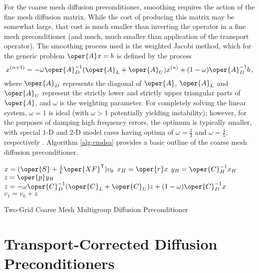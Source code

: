 For the coarse mesh diffusion preconditioner, smoothing requires the action 
of the fine mesh diffusion matrix.  While the cost of producing this 
matrix may be somewhat large, that cost is much smaller than inverting 
the operator in a fine mesh preconditioner (and much, much smaller than
application of the transport operator).  The smoothing process used is 
the weighted Jacobi method, which for the generic problem $\oper{A}x=b$ is 
defined  by the process 
\begin{equation}
 x^{(n+1)} = -\omega \oper{A}_D^{-1} ( \oper{A}_L + \oper{A}_U) x^{(n)}
           + (1-\omega) \oper{A}_D^{-1} b \, ,
\end{equation}
where $\oper{A}_D$ represents the diagonal of $\oper{A}$, 
$\oper{A}_L$ and $\oper{A}_U$ represent the strictly lower and strictly 
upper triangular parts of $\oper{A}$, and $\omega$ is the weighting 
parameter.  For completely solving the linear system, $\omega = 1$ is ideal 
(with $\omega > 1$ potentially yielding instability);
however, for the purposes of damping high frequency errors, the optimum is 
typically smaller, with special 1-D and 2-D model cases having optima 
of $\omega = \frac{2}{3}$ and $\omega = \frac{4}{5}$, 
respectively \cite{saad2003ims}.  
Algorithm \ref{alg:cmdsa} provides a basic outline of the coarse mesh 
diffusion preconditioner.

\begin{algorithm}[ht]
  \DontPrintSemicolon
  $x = (\oper{S} + \frac{1}{k}\oper{XF}^{\transp}) v_0$ \;
  $x_H = \oper{r}x$ \;
  $y_H = \oper{C}^{-1}_H x_H$ \;
  $z = \oper{p} y_H$ \;
  {
    $z =  -\omega \oper{C}_D^{-1} ( \oper{C}_L + \oper{C}_U) z
       + (1-\omega) \oper{C}_D^{-1} x $
  }
  $v_1 = v_0 + z$\;
  \caption{Two-Grid Coarse Mesh Multigroup Diffusion Preconditioner}
  \label{alg:cmdsa}
\end{algorithm}

\section{Transport-Corrected Diffusion Preconditioners}
\label{sec:tcdpc}

